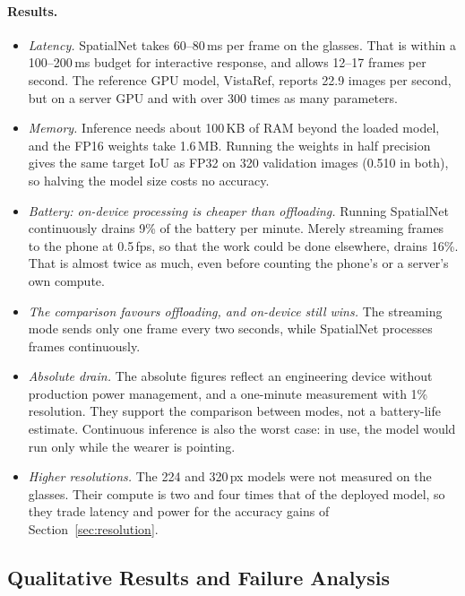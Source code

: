 \paragraph{Results.}
\begin{itemize}
\item \emph{Latency.} SpatialNet takes 60--80\,ms per frame on the glasses. That is within a 100--200\,ms budget for interactive response, and allows 12--17 frames per second. The reference GPU model, VistaRef, reports 22.9 images per second, but on a server GPU and with over 300 times as many parameters.
\item \emph{Memory.} Inference needs about 100\,KB of RAM beyond the loaded model, and the FP16 weights take 1.6\,MB. Running the weights in half precision gives the same target IoU as FP32 on 320 validation images (0.510 in both), so halving the model size costs no accuracy.
\item \emph{Battery: on-device processing is cheaper than offloading.} Running SpatialNet continuously drains 9\% of the battery per minute. Merely streaming frames to the phone at 0.5\,fps, so that the work could be done elsewhere, drains 16\%. That is almost twice as much, even before counting the phone's or a server's own compute.
\item \emph{The comparison favours offloading, and on-device still wins.} The streaming mode sends only one frame every two seconds, while SpatialNet processes frames continuously.
\item \emph{Absolute drain.} The absolute figures reflect an engineering device without production power management, and a one-minute measurement with 1\% resolution. They support the comparison between modes, not a battery-life estimate. Continuous inference is also the worst case: in use, the model would run only while the wearer is pointing.
\item \emph{Higher resolutions.} The 224 and 320\,px models were not measured on the glasses. Their compute is two and four times that of the deployed model, so they trade latency and power for the accuracy gains of Section~\ref{sec:resolution}.
\end{itemize}

\subsection{Qualitative Results and Failure Analysis}\label{sec:qual}

